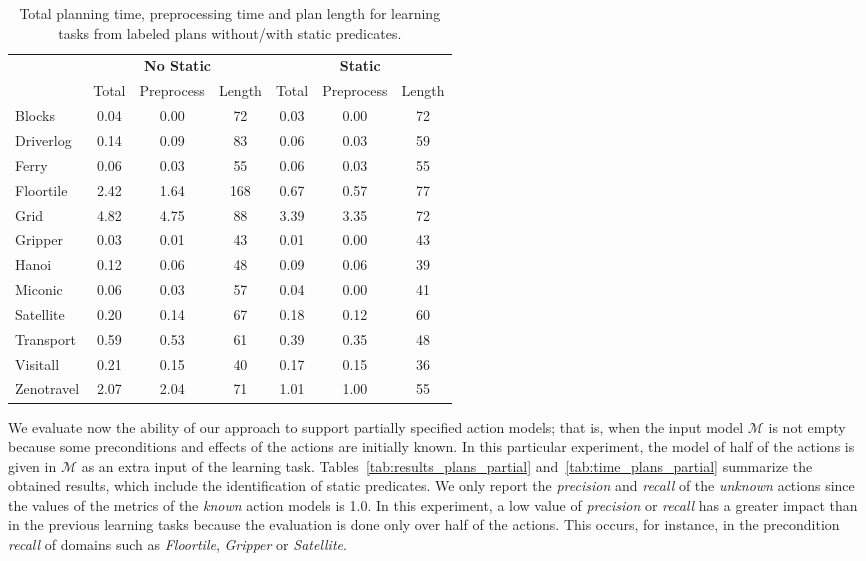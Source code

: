 \documentclass[3p,times]{elsarticle}
\begin{document}
\begin{table}
\begin{scriptsize}
	\begin{center}
		\begin{tabular}{l|c|c|c||c|c|c|}
                         & \multicolumn{3}{|c||}{\bf No Static}& \multicolumn{3}{|c|}{\bf Static}\\
			 & Total & Preprocess & Length  & Total & Preprocess &  Length\\
                         \hline
			Blocks & 0.04 & 0.00 & 72  & 0.03 & 0.00 & 72 \\
			Driverlog & 0.14 & 0.09 & 83 & 0.06 & 0.03 & 59 \\
			Ferry & 0.06 & 0.03 & 55 & 0.06 & 0.03 & 55 \\
			Floortile & 2.42 & 1.64 & 168 & 0.67 & 0.57 & 77 \\
			Grid & 4.82 & 4.75 & 88 & 3.39 & 3.35 & 72 \\
			Gripper & 0.03 & 0.01 & 43 & 0.01 & 0.00 & 43 \\
                        Hanoi & 0.12 & 0.06 & 48 & 0.09 & 0.06 & 39 \\
                        Miconic & 0.06 & 0.03 & 57 & 0.04 & 0.00 & 41 \\
			Satellite & 0.20 & 0.14 & 67 & 0.18 & 0.12 & 60 \\
			Transport & 0.59 & 0.53 & 61 & 0.39 & 0.35 & 48 \\
			Visitall & 0.21 & 0.15 & 40 & 0.17 & 0.15 & 36 \\
			Zenotravel & 2.07 & 2.04 & 71 & 1.01 & 1.00 & 55 \\			
		\end{tabular}
	\end{center}
        \end{scriptsize}
	\caption{\small Total planning time, preprocessing time and plan length for learning tasks from labeled plans without/with static predicates.}
	\label{tab:time_plans}	
\end{table}

We evaluate now the ability of our approach to support partially specified action models; that is, when the input model $\mathcal{M}$ is not empty because some preconditions and effects of the actions are initially known.  In this particular experiment, the model of half of the actions is given in $\mathcal{M}$ as an extra input of the learning task. Tables~\ref{tab:results_plans_partial} and~\ref{tab:time_plans_partial} summarize the obtained results, which include the identification of static predicates. We only report the {\em precision} and {\em recall} of the {\em unknown} actions since the values of the metrics of the {\em known} action models is 1.0. In this experiment, a low value of {\em precision} or {\em recall} has a greater impact than in the previous learning tasks because the evaluation is done only over half of the actions. This occurs, for instance, in the precondition \emph{recall} of domains such as {\em Floortile}, {\em Gripper} or {\em Satellite}.
\end{document}
